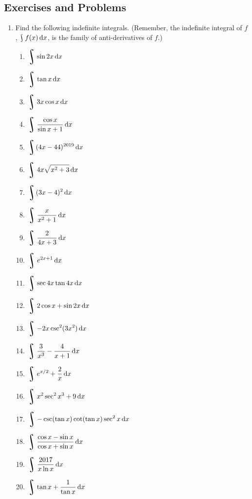 \subsection{Exercises and Problems}
\begin{enumerate}
  \item Find the following indefinite integrals. (Remember, the indefinite integral of $ f $, $ \rint f(x) \dif{x} $, is
        the family of anti-derivatives of $ f $.)
    \begin{multicols}{2}
    \begin{enumerate}
      \item $\displaystyle \rint \sin 2x \dif{x} $
      \item $\displaystyle \rint \tan x \dif{x} $
      \item $\displaystyle \rint 3x\cos x \dif{x} $
      \item $\displaystyle \rint \frac{\cos x}{\sin x + 1} \dif{x} $
      \item $\displaystyle \rint (4x - 44)^{2019} \dif{x} $
      \item $\displaystyle \rint 4x \sqrt{x^2 + 3} \dif{x} $
      \item $\displaystyle \rint (3x - 4)^2 \dif{x} $
      \item $\displaystyle \rint \frac{x}{x^2 + 1} \dif{x} $
      \item $\displaystyle \rint \frac{2}{4x + 3} \dif{x} $
      \item $\displaystyle \rint e^{2x + 1} \dif{x} $
      \item $\displaystyle \rint \sec 4x \tan 4x \dif{x} $
      \item $\displaystyle \rint 2\cos x + \sin 2x \dif{x} $
      \item $\displaystyle \rint -2x\csc^2 (3x^2) \dif{x} $
      \item $\displaystyle \rint \frac{3}{x^3} - \frac{4}{x + 1} \dif{x} $
      \item $\displaystyle \rint e^{x/2} + \frac{2}{x} \dif{x} $
      \item $\displaystyle \rint x^2 \sec^2 x^3 + 9 \dif{x} $
      \item $\displaystyle \rint -\csc (\tan x) \cot (\tan x) \sec^2 x \dif{x} $
      \item $\displaystyle \rint \frac{\cos x - \sin x}{\cos x + \sin x} \dif{x} $
      \item $\displaystyle \rint \frac{2017}{x\ln x} \dif{x} $
      \item $\displaystyle \rint \tan x + \frac{1}{\tan x} \dif{x} $

\end{enumerate}
\end{multicols}
\end{enumerate}
